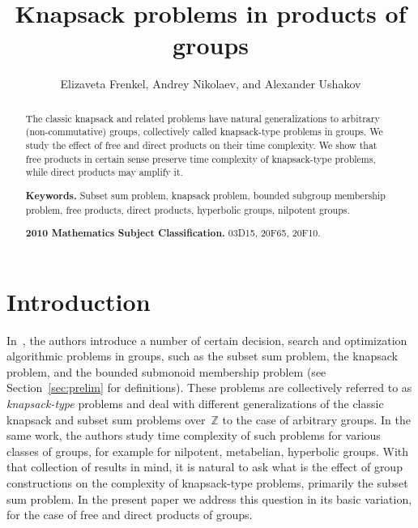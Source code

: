 \documentclass[10pt]{amsart}
\title{Knapsack problems in products of groups}
\author[]{Elizaveta Frenkel, Andrey Nikolaev, and Alexander Ushakov}
\theoremstyle{definition}
\begin{document}
\begin{abstract}
The classic knapsack and related problems have natural generalizations to arbitrary (non-commutative) groups, collectively called knapsack-type problems in groups. We study the effect of free and direct products on their time complexity. We show that free products in certain sense preserve time complexity of knapsack-type problems, while direct products may amplify it.

\noindent
{\bf Keywords.} Subset sum problem,  knapsack problem, bounded subgroup membership problem, free products, direct products, hyperbolic groups, nilpotent groups.

\noindent
{\bf 2010 Mathematics Subject Classification.} 03D15, 20F65, 20F10.
\end{abstract}
\maketitle


\section{Introduction}\label{sec:intro}


In~\cite{Miasnikov-Nikolaev-Ushakov:2014a}, the authors introduce a number of certain decision, search and optimization algorithmic problems in groups, such as the subset sum problem, the knapsack problem, and the bounded submonoid membership problem (see Section~\ref{sec:prelim} for definitions). These problems are collectively referred to as {\em knapsack-type} problems and deal with different generalizations of the classic knapsack and subset sum problems over~$\mathbb Z$ to the case of arbitrary groups. In the same work, the authors study time complexity of such problems for various classes of groups, for example for nilpotent, metabelian, hyperbolic groups. With that collection of results in mind, it is natural to ask what is the effect of group constructions on the complexity of knapsack-type problems, primarily the subset sum problem. In the present paper we address this question in its basic variation, for the case of free and direct products of groups.
\end{document}
